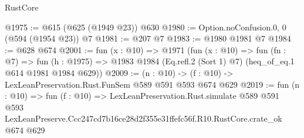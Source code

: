 \begin{lexlean}{RustCore}
\begin{coremodule}
@1975 := @615 (@625 (@1949 @23)) @630
@1980 := Option.noConfusion.{0, 0} (@594 (@1954 @23)) @7
@1981 := @207 @7
@1983 := @1980 @1981 @7
@1984 := @628 @674
@2001 := fun (x : @10) =>
  @1971
    (fun (x : @10) =>
    fun (fn : @7) =>
    fun (h : @1975) => @1983 @1984 (Eq.refl.{2} (Sort 1) @7) (heq_of_eq.{1} @614 @1981 @1984 @629))
@2009 := (n : @10) -> (f : @10) -> LexLeanPreservation.Rust.FunSem @589 @591 @593 @674 @629
@2019 := fun (n : @10) =>
  fun (f : @10) =>
  LexLeanPreservation.Rust.simulate
    @589
    @591
    @593
    LexLeanPreserve.Ccc247cd7b16ce28d2f355e31ffefc56f.R10.RustCore.crate_ok
    @674
    @629
\end{coremodule}
\end{lexlean}
